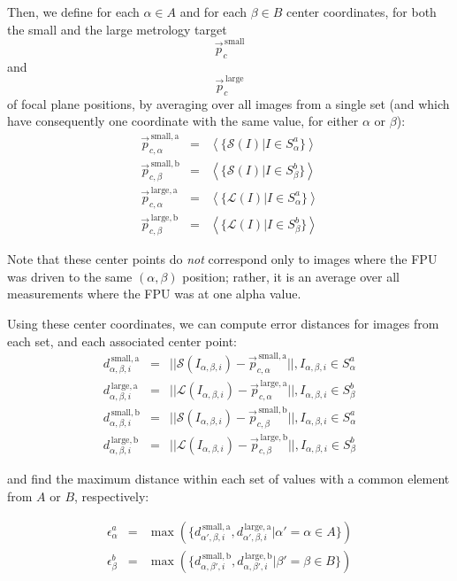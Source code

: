 \documentclass[11pt,a4paper,twoside]{scrartcl}
\begin{document}
Then, we define for each $\alpha \in A$ and for each $\beta \in B$
center coordinates, for both the small and the large metrology target
\[
\vec{p}_c^\mathrm{\,small}
\] and
\[
\vec{p}_c^\mathrm{\,large}
\]
of focal plane positions, by averaging over all images from a single
set (and which have consequently one coordinate with the same value, for
either $\alpha$ or $\beta$):
\begin{eqnarray}
  \vec{p}_{c,\alpha}^\mathrm{\,small,a} & = &  \left< \{ \mathcal{S}(I) | I \in S^a_\alpha  \} \right> \\
  \vec{p}_{c,\beta}^\mathrm{\,small,b}  & = &  \left< \{ \mathcal{S}(I) | I \in S^b_\beta \} \right> \\
  \vec{p}_{c,\alpha}^\mathrm{\,large,a} & = &  \left< \{ \mathcal{L}(I) | I \in S^a_\alpha \} \right> \\
  \vec{p}_{c,\beta}^\mathrm{\,large,b}  & = &  \left< \{ \mathcal{L}(I) | I \in S^b_\beta \} \right>
\end{eqnarray}

Note that these center points do \emph{not} correspond only to images
where the FPU was driven to the same $(\alpha, \beta)$ position;
rather, it is an average over all measurements where the FPU was at
one alpha value.

Using these center coordinates, we can compute error distances for
images from each set, and each associated center point:
\begin{eqnarray}
  d^\mathrm{\,small,a}_{\alpha,\beta,i} & = & ||\mathcal{S}(I_{\alpha,\beta,i}) - \vec{p}_{c,\alpha}^\mathrm{\,small,a} ||,  I_{\alpha,\beta,i} \in S^a_\alpha \\
  d^\mathrm{\,large,a}_{\alpha,\beta,i} & = & ||\mathcal{L}(I_{\alpha,\beta,i}) - \vec{p}_{c,\alpha}^\mathrm{\,large,a} ||,  I_{\alpha,\beta,i} \in S^b_\beta  \\
  d^\mathrm{\,small,b}_{\alpha,\beta,i} & = & ||\mathcal{S}(I_{\alpha,\beta,i}) - \vec{p}_{c,\beta}^\mathrm{\,small,b} ||,   I_{\alpha,\beta,i} \in S^a_\alpha \\
  d^\mathrm{\,large,b}_{\alpha,\beta,i} & = & ||\mathcal{L}(I_{\alpha,\beta,i}) - \vec{p}_{c,\beta}^\mathrm{\,large,b} ||,   I_{\alpha,\beta,i} \in S^b_\beta
\end{eqnarray}

and find the maximum distance within each set of values with a common element from $A$ or $B$, respectively:

\begin{eqnarray}
\epsilon^{a}_\alpha & = & \max(\{ d^\mathrm{\,small,a}_{\alpha',\beta,i}, d^\mathrm{\,large,a}_{\alpha',\beta,i} | \alpha' = \alpha \in A \}) \\
\epsilon^{b}_\beta & = & \max(\{ d^\mathrm{\,small,b}_{\alpha,\beta',i}, d^\mathrm{\,large,b}_{\alpha,\beta',i} | \beta' = \beta \in B \})
\end{eqnarray}
\end{document}
